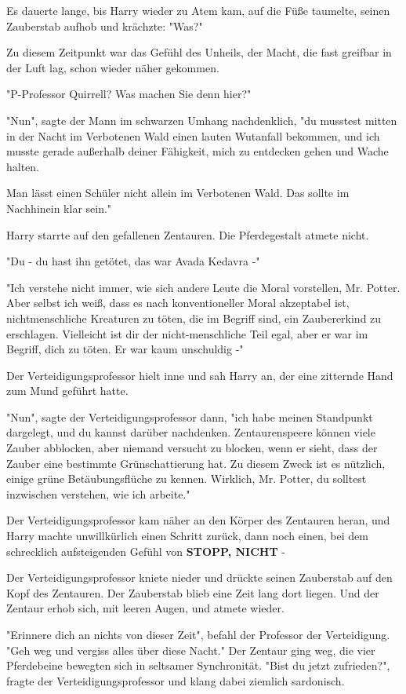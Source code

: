 {Es dauerte lange, bis Harry wieder zu Atem kam, auf die Füße taumelte, seinen Zauberstab aufhob und krächzte: "Was?"

Zu diesem Zeitpunkt war das Gefühl des Unheils, der Macht, die fast greifbar in der Luft lag, schon wieder näher gekommen.

"P-Professor Quirrell? Was machen Sie denn hier?"

"Nun", sagte der Mann im schwarzen Umhang nachdenklich, "du musstest mitten in der Nacht im Verbotenen Wald einen lauten Wutanfall bekommen, und ich musste gerade außerhalb deiner Fähigkeit, mich zu entdecken gehen und Wache halten.

Man lässt einen Schüler nicht allein im Verbotenen Wald. Das sollte im Nachhinein klar sein."

Harry starrte auf den gefallenen Zentauren. Die Pferdegestalt atmete nicht.

"Du - du hast ihn getötet, das war Avada Kedavra -"

"Ich verstehe nicht immer, wie sich andere Leute die Moral vorstellen, Mr. Potter. Aber selbst ich weiß, dass es nach konventioneller Moral akzeptabel ist, nichtmenschliche Kreaturen zu töten, die im Begriff sind, ein Zaubererkind zu erschlagen. Vielleicht ist dir der nicht-menschliche Teil egal, aber er war im Begriff, dich zu töten. Er war kaum unschuldig -"

Der Verteidigungsprofessor hielt inne und sah Harry an, der eine zitternde Hand zum Mund geführt hatte.

"Nun", sagte der Verteidigungsprofessor dann, "ich habe meinen Standpunkt dargelegt, und du kannst darüber nachdenken. Zentaurenspeere können viele Zauber abblocken, aber niemand versucht zu blocken, wenn er sieht, dass der Zauber eine bestimmte Grünschattierung hat. Zu diesem Zweck ist es nützlich, einige grüne Betäubungsflüche zu kennen. Wirklich, Mr. Potter, du solltest inzwischen verstehen, wie ich arbeite."

Der Verteidigungsprofessor kam näher an den Körper des Zentauren heran, und Harry machte unwillkürlich einen Schritt zurück, dann noch einen, bei dem schrecklich aufsteigenden Gefühl von \textbf{STOPP, NICHT} -

Der Verteidigungsprofessor kniete nieder und drückte seinen Zauberstab auf den Kopf des Zentauren. Der Zauberstab blieb eine Zeit lang dort liegen. Und der Zentaur erhob sich, mit leeren Augen, und atmete wieder.

"Erinnere dich an nichts von dieser Zeit", befahl der Professor der Verteidigung. "Geh weg und vergiss alles über diese Nacht." Der Zentaur ging weg, die vier Pferdebeine bewegten sich in seltsamer Synchronität. "Bist du jetzt zufrieden?", fragte der Verteidigungsprofessor und klang dabei ziemlich sardonisch.

}
